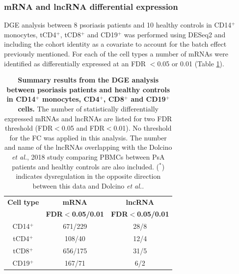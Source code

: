 \begin{figure}[htbp]
\label{figure:RNAseq_PCA_and_heat_map}
\end{figure}


\subsubsection{mRNA and lncRNA differential expression}

DGE analysis between 8 psoriasis patients and 10 healthy controls in CD14$^+$ monocytes, tCD4$^+$, tCD8$^+$ and CD19$^+$ was performed using DESeq2 and including the cohort identity as a covariate to account for the batch effect previously mentioned. For each of the cell types a number of mRNAs were identified as differentially expressed at an FDR $<$0.05 or 0.01 (Table \ref{tab:RNAseq_PS_CTL_differential_analysis_results}).  

\begin{table}[htbp]
\centering
\begin{tabular}{@{} c c c}
\toprule
\textbf{Cell type}   & \textbf{mRNA}            & \textbf{lncRNA}           \\
                     & \textbf{FDR$<$0.05/0.01} & \textbf{FDR$<$0.05/0.01}  \\
\midrule
\midrule
CD14$^+$             & 671/229 & 28/8 \\               
tCD4$^+$              & 108/40  & 12/4 \\
tCD8$^+$              & 656/175 & 31/5 \\
CD19$^+$             & 167/71  & 6/2\\
\bottomrule 
\end{tabular}
\medskip %
\caption[Summary results from the DGE analysis between psoriasis patients and healthy controls in CD14$^+$ monocytes, CD4$^+$, CD8$^+$ and CD19$^+$ cells.]{\textbf{Summary results from the DGE analysis between psoriasis patients and healthy controls in CD14$^+$ monocytes, CD4$^+$, CD8$^+$ and CD19$^+$ cells.} The number of statistically differentially expressed mRNAs and lncRNAs are listed for two FDR threshold (FDR$<$0.05 and FDR$<$0.01). No threshold for the FC was applied in this analysis. The number and name of the lncRNAs overlapping with the Dolcino \textit{et al.}, 2018 study comparing PBMCs between PsA patients and healthy controls are also included. ($^{\ast}$) indicates dysregulation in the opposite direction between this data and Dolcino \textit{et al.}.}
\label{tab:RNAseq_PS_CTL_differential_analysis_results}
\end{table}
\bigskip %

